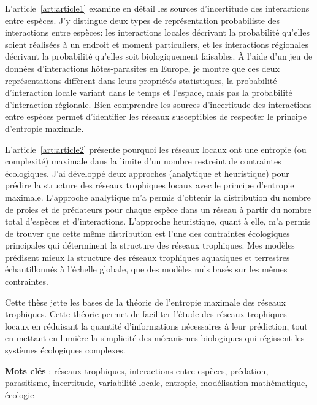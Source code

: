 \documentclass[12pt,twoside,phd]{dms}
\numberwithin{equation}{section}
\numberwithin{table}{chapter}
\numberwithin{figure}{chapter}
\begin{document}
L'article~\ref{art:article1} examine en détail les sources d'incertitude des interactions entre
espèces. J'y distingue deux types de représentation probabiliste des
interactions entre espèces: les interactions locales décrivant la probabilité
qu'elles soient réalisées à un endroit et moment particuliers, et les
interactions régionales décrivant la probabilité qu'elles soit biologiquement
faisables. À l'aide d'un jeu de données d'interactions hôtes-parasites en
Europe, je montre que ces deux représentations diffèrent dans leurs propriétés
statistiques, la probabilité d'interaction locale variant dans le temps et
l'espace, mais pas la probabilité d'interaction régionale. Bien comprendre les
sources d'incertitude des interactions entre espèces permet d'identifier les
réseaux susceptibles de respecter le principe d'entropie maximale.

L'article~\ref{art:article2} présente pourquoi les réseaux locaux ont une entropie (ou
complexité) maximale dans la limite d'un nombre restreint de contraintes
écologiques. J'ai développé deux approches (analytique et heuristique) pour
prédire la structure des réseaux trophiques locaux avec le principe d'entropie
maximale. L'approche analytique m'a permis d'obtenir la distribution du nombre
de proies et de prédateurs pour chaque espèce dans un réseau à partir du nombre
total d'espèces et d'interactions. L'approche heuristique, quant à elle, m'a
permis de trouver que cette même distribution est l'une des contraintes
écologiques principales qui déterminent la structure des réseaux trophiques. Mes
modèles prédisent mieux la structure des réseaux trophiques aquatiques et
terrestres échantillonnés à l'échelle globale, que des modèles nuls basés sur
les mêmes contraintes.

Cette thèse jette les bases de la théorie de l'entropie maximale des réseaux
trophiques. Cette théorie permet de faciliter l'étude des réseaux trophiques
locaux en réduisant la quantité d'informations nécessaires à leur prédiction,
tout en mettant en lumière la simplicité des mécanismes biologiques qui
régissent les systèmes écologiques complexes.

\textbf{Mots clés} : réseaux trophiques, interactions entre espèces, prédation, parasitisme, incertitude, variabilité locale, entropie, modélisation mathématique, écologie

\end{document}
